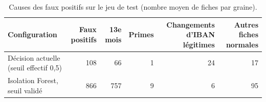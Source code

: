 \begin{table}[htbp]
\centering
\caption{Causes des faux positifs sur le jeu de test (nombre moyen de fiches par graine).}
\label{tab:causes_faux_positifs}
\small
\begin{tabular}{p{4.2cm}rrrrr}
\toprule
\textbf{Configuration} & \textbf{Faux positifs} & \textbf{13e mois} & \textbf{Primes} & \textbf{Changements d'IBAN légitimes} & \textbf{Autres fiches normales} \\
\midrule
Décision actuelle (seuil effectif 0,5) & 108 & 66 & 1 & 24 & 17 \\
Isolation Forest, seuil validé & 866 & 757 & 9 & 6 & 95 \\
\bottomrule
\end{tabular}
\end{table}
